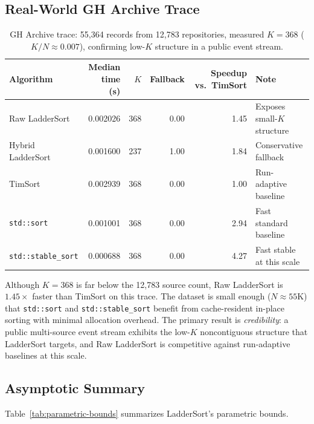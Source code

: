 \documentclass[12pt,a4paper]{article}
\theoremstyle{plain}
\theoremstyle{definition}
\begin{document}
\subsection{Real-World GH Archive Trace}
\label{sec:gharchive}

\begin{table}[H]
\centering\small
\caption{GH Archive trace: 55,364 records from 12,783 repositories, measured
  $K=368$ ($K/N \approx 0.007$), confirming low-$K$ structure in a public
  event stream.}
\label{tab:phase6-real-trace}
\begin{tabularx}{\linewidth}{@{}lrrrrX@{}}
\toprule
Algorithm & Median time (s) & $K$ & Fallback & Speedup vs.\ TimSort & Note \\
\midrule
Raw LadderSort    & 0.002026 & 368 & 0.00 & 1.45 & Exposes small-$K$ structure \\
Hybrid LadderSort & 0.001600 & 237 & 1.00 & 1.84 & Conservative fallback \\
TimSort           & 0.002939 & 368 & 0.00 & 1.00 & Run-adaptive baseline \\
\texttt{std::sort}       & 0.001001 & 368 & 0.00 & 2.94 & Fast standard baseline \\
\texttt{std::stable\_sort} & 0.000688 & 368 & 0.00 & 4.27 & Fast stable at this scale \\
\bottomrule
\end{tabularx}
\end{table}

Although $K=368$ is far below the 12,783 source count, Raw LadderSort
is $1.45\times$ faster than TimSort on this trace.  The dataset is small
enough ($N \approx 55$K) that \texttt{std::sort} and \texttt{std::stable\_sort}
benefit from cache-resident in-place sorting with minimal allocation overhead.
The primary result is \emph{credibility}: a public multi-source event stream
exhibits the low-$K$ noncontiguous structure that LadderSort targets, and Raw
LadderSort is competitive against run-adaptive baselines at this scale.

\subsection{Asymptotic Summary}

Table~\ref{tab:parametric-bounds} summarizes LadderSort's parametric bounds.
\end{document}
